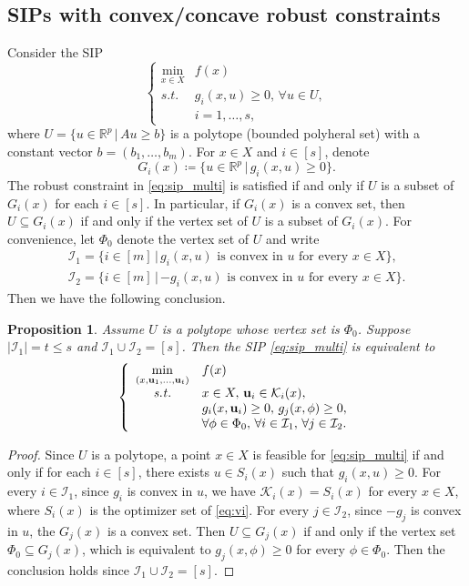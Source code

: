 \documentclass{amsart}
\theoremstyle{plain}
\newtheorem{prop}[theorem]{Proposition}
\newcommand{\re}{\mathbb{R}}
\newcommand{\st}{\mathit{s.t.}}
\newcommand{\mc}[1]{\mathcal{#1}}
\numberwithin{equation}{section}
\begin{document}
		\subsection{SIPs with convex/concave robust constraints}
		Consider the SIP 
		\begin{equation}\label{eq:sip_multi}
			\left\{\begin{array}{cl}
				\min\limits_{x\in X} & f(x)\\
				\st & g_i(x,u)\ge 0,\,\forall u\in U,\\
				& i=1,\ldots, s,
			\end{array}
			\right.
		\end{equation}
		where $U = \{u\in\re^p\,\vert\, Au\ge b\}$ is a polytope (bounded polyheral set) with a constant 
		vector $b = (b_1,\ldots, b_m)$. 
		For $x\in X$ and $i\in [s]$, 
		denote 
		\[
		G_i(x)\coloneqq \{u\in\re^p\,\vert\, g_i(x,u)\ge 0\}.
		\]
		The robust constraint in \eqref{eq:sip_multi} is satisfied if and 
		only if $U$ is a subset of $G_i(x)$ for each $i\in[s]$. 
		In particular, if $G_i(x)$ is a convex set, then $U\subseteq G_i(x)$
		if and only if the vertex set of $U$ is a subset of $G_i(x)$.
		For convenience, let $\Phi_0$ denote the vertex set of $U$ and write
		\[\begin{array}{l}
		\mc{I}_1 = \{i\in[m]\,\vert\, \mbox{$g_i(x,u)$ is convex in $u$ for every $x\in X$}\},\\
		\mc{I}_2 = \{i\in[m]\,\vert\, \mbox{$-g_i(x,u)$ is convex in $u$ for every $x\in X$}\}.
		\end{array}
		\]
		Then we have the following conclusion. 
		\begin{prop}\label{prop:convconc}
		Assume $U$ is a polytope whose vertex set is $\Phi_0$.  
		Suppose $|\mc{I}_1| = t\le s$
		and $\mc{I}_1\cup \mc{I}_2 = [s]$.
		Then the SIP \eqref{eq:sip_multi} is equivalent to 
			\begin{equation}\label{eq:mconvgsip2}
				\left\{\begin{array}{cl}
					\min\limits_{(x,{\bf u}_1,\ldots,{\bf u}_t)} & f(x)\\
					\st & x\in X,\, {\bf u}_i\in \mc{K}_i(x),\\
					& g_i(x,{\bf u}_i)\ge 0,\, g_j(x,\phi)\ge 0,\\
					& \forall \phi\in \Phi_0,\, \forall i\in\mc{I}_1,\,\forall  j\in \mc{I}_2.
				\end{array}
				\right.
			\end{equation}
		\end{prop}
		\begin{proof}
			Since $U$ is a polytope, a point $x\in X$ is feasible for \eqref{eq:sip_multi}
			if and only if for each $i\in[s]$, there exists $u\in S_i(x)$ such that 
			$g_i(x,u)\ge 0$.
			For every $i\in \mc{I}_1$, since $g_i$ is convex in $u$, we have 
			$\mc{K}_i(x) = S_i(x)$ for every $x\in X$,
			where $S_i(x)$ is the optimizer set of \eqref{eq:vi}.
			For every $j\in\mc{I}_2$, since $-g_j$ is convex in $u$, 
			the $G_j(x)$ is a convex set.
			Then $U\subseteq G_j(x)$ if and only if the vertex set $\Phi_0\subseteq G_j(x)$,
			which is equivalent to $g_j(x,\phi)\ge 0$ for every $\phi\in \Phi_0$.
			Then the conclusion holds since $\mc{I}_1\cup \mc{I}_2 = [s]$.
		\end{proof}
\end{document}
